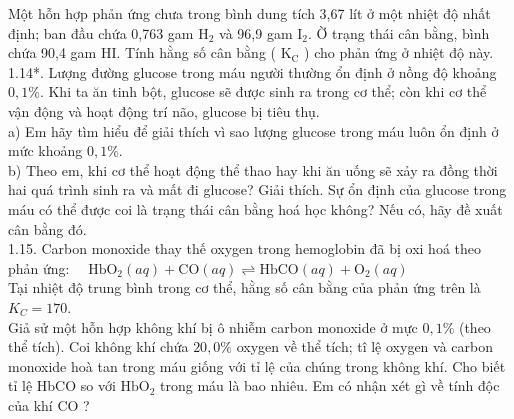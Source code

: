 \documentclass[10pt]{article}
\begin{document}
Một hỗn hợp phản ứng chưa trong bình dung tích 3,67 lít ở một nhiệt độ nhất định; ban đầu chứa 0,763 gam $\mathrm{H}_{2}$ và 96,9 gam $\mathrm{I}_{2}$. Ờ trạng thái cân bằng, bình chứa 90,4 gam HI. Tính hằng số cân bằng ( $\mathrm{K}_{\mathrm{C}}$ ) cho phản ứng ở nhiệt độ này.\\
1.14*. Lượng đường glucose trong máu người thường ổn định ở nồng độ khoảng $0,1 \%$. Khi ta ăn tinh bột, glucose sẽ được sinh ra trong cơ thể; còn khi cơ thể vận động và hoạt động trí não, glucose bị tiêu thụ.\\
a) Em hãy tìm hiểu để giải thích vì sao lượng glucose trong máu luôn ổn định ở mức khoảng $0,1 \%$.\\
b) Theo em, khi cơ thể hoạt động thể thao hay khi ăn uống sẽ xảy ra đồng thời hai quá trình sinh ra và mất đi glucose? Giải thích. Sự ổn định của glucose trong máu có thể được coi là trạng thái cân bằng hoá học không? Nếu có, hãy đề xuất cân bằng đó.\\
1.15. Carbon monoxide thay thế oxygen trong hemoglobin đã bị oxi hoá theo phản ứng: $\quad \mathrm{HbO}_{2}(a q)+\mathrm{CO}(a q) \rightleftharpoons \mathrm{HbCO}(a q)+\mathrm{O}_{2}(a q)$\\
Tại nhiệt độ trung bình trong cơ thể, hằng số cân bằng của phản ứng trên là $K_{C}=170$.\\
Giả sử một hỗn hợp không khí bị ô nhiễm carbon monoxide ở mực $0,1 \%$ (theo thể tích). Coi không khí chứa $20,0 \%$ oxygen về thể tích; tî lệ oxygen và carbon monoxide hoà tan trong máu giống với tỉ lệ của chúng trong không khí. Cho biết tỉ lệ HbCO so với $\mathrm{HbO}_{2}$ trong máu là bao nhiêu. Em có nhận xét gì về tính độc của khí CO ?
\end{document}
